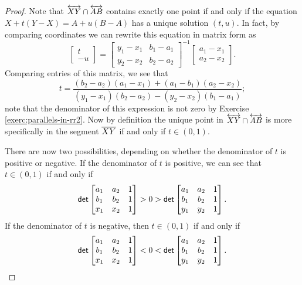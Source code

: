 \begin{proof}
Note that \(\overleftrightarrow{XY} \cap \overleftrightarrow{AB}\) contains exactly one point if and only if the equation \(X + t(Y-X) = A + u(B-A)\) has a unique solution \((t,u)\).
In fact, by comparing coordinates we can rewrite this equation in matrix form as \[ \begin{bmatrix} t \\ -u \end{bmatrix} = \begin{bmatrix} y_1 - x_1 & b_1 - a_1 \\ y_2 - x_2 & b_2 - a_2 \end{bmatrix}^{-1} \begin{bmatrix} a_1 - x_1 \\ a_2 - x_2 \end{bmatrix}. \]
Comparing entries of this matrix, we see that \[ t = \frac{(b_2-a_2)(a_1-x_1) + (a_1-b_1)(a_2-x_2)}{(y_1-x_1)(b_2-a_2) - (y_2-x_2)(b_1-a_1)}; \] note that the denominator of this expression is not zero by Exercise \ref{exerc:parallels-in-rr2}.
Now by definition the unique point in \(\overleftrightarrow{XY} \cap \overleftrightarrow{AB}\) is more specifically in the segment \(\overline{XY}\) if and only if \(t \in (0,1)\).

There are now two possibilities, depending on whether the denominator of \(t\) is positive or negative.
If the denominator of \(t\) is positive, we can see that \(t \in (0,1)\) if and only if \[ \mathsf{det} \begin{bmatrix} a_1 & a_2 & 1 \\ b_1 & b_2 & 1 \\ x_1 & x_2 & 1 \end{bmatrix} > 0 > \mathsf{det} \begin{bmatrix} a_1 & a_2 & 1 \\ b_1 & b_2 & 1 \\ y_1 & y_2 & 1 \end{bmatrix}. \]
If the denominator of \(t\) is negative, then \(t \in (0,1)\) if and only if \[ \mathsf{det} \begin{bmatrix} a_1 & a_2 & 1 \\ b_1 & b_2 & 1 \\ x_1 & x_2 & 1 \end{bmatrix} < 0 < \mathsf{det} \begin{bmatrix} a_1 & a_2 & 1 \\ b_1 & b_2 & 1 \\ y_1 & y_2 & 1 \end{bmatrix}. \]
\qedhere
\end{proof}

